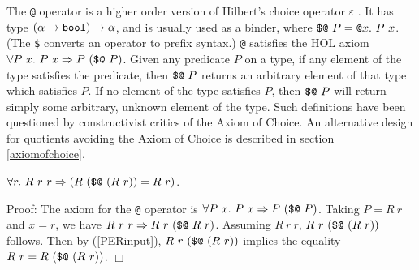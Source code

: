 \documentclass[envcountsame,runningheads]{llncs}
\begin{document}
The {\tt @} operator
is a higher order version of Hilbert's choice operator $\varepsilon$
\cite{GoMe93,Lei69}.
It has type $(\alpha \rightarrow \mbox{\tt bool}) \rightarrow \alpha$,
and is usually used as a binder,
where
$\mbox{\tt \$@}\ P = \mbox{\tt @}x.\ P\ x$.
(The {\tt \$} converts an operator to prefix syntax.)
{\tt @} satisfies the HOL axiom
$\forall P\ x.\ P\ x \Rightarrow P\ (\mbox{\tt \$@}\ P)$.
Given any predicate $P$ on a type,
if any element of the type satisfies the predicate,
then $\mbox{\tt \$@}\ P$ returns an arbitrary element of
that type which satisfies $P$.
If no element of the type satisfies $P$,
then $\mbox{\tt \$@}\ P$ will return simply some
arbitrary,
unknown
element of the type.
%
%
Such definitions
have been questioned by constructivist critics of the Axiom of Choice.
An alternative design for quotients avoiding
the Axiom of Choice
is described in section \ref{axiomofchoice}.


\begin{lemma}
\label{ty_REL_SELECT_REL}
$\forall r.\
R\ r\ r \Rightarrow
(R\ (\mbox{\tt \$@} \ (R\ r)) = R\ r)$.
\end{lemma}
Proof:
The axiom for the {\tt @} operator is
$\forall P\ x.\ P\ x \Rightarrow P\ (\mbox{\tt \$@}\ P)$.
Taking $P = R\ r$ and $x = r$, we have
$R\ r\ r \Rightarrow R\ r\ (\mbox{\tt \$@}\ R\ r)$.
Assuming $R\ r\ r$,
$R\ r\ (\mbox{\tt \$@} \ (R\ r))$ follows.
Then
by (\ref{PERinput}),
$R\ r\ (\mbox{\tt \$@} \ (R\ r))$ implies the equality
$R\ r = R\ (\mbox{\tt \$@} \ (R\ r))$.
$\Box$
\end{document}
